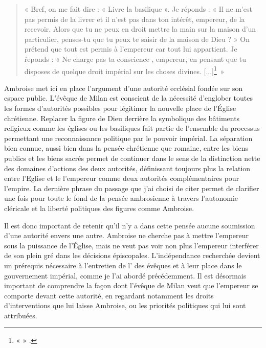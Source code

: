 \bigskip

\begin{quote}
    « Bref, on me fait dire : « Livre la basilique ». Je réponds : « Il ne m’est pas permis de la livrer et il n’est pas dans ton intérêt, empereur, de la recevoir. Alors que tu ne peux en droit mettre la main sur la maison d’un particulier, penses-tu que tu peux te saisir de la maison de Dieu ? » On prétend que tout est permis à l’empereur car tout lui appartient. Je ŕeponds : « Ne charge pas ta conscience , empereur, en pensant que tu disposes de quelque droit impérial sur les choses divines. [...]\footnote{«  » \cite[,19]{ambroise_lettres}.}~»
\end{quote}

\bigskip

Ambroise met ici en place l’argument d’une autorité ecclésial fondée sur son espace public. L’évêque de Milan est conscient de la nécessité d’englober toutes les formes d’autorités possibles pour légitimer la nouvelle place de l’Église chrétienne. Replacer la figure de Dieu derrière la symbolique des bâtiments religieux comme les églises ou les basiliques fait partie de l’ensemble du processus permettant une reconnaissance politique par le pouvoir impérial. La séparation bien connue, aussi bien dans la pensée chrétienne que romaine, entre les biens publics et les biens sacrés permet de continuer dans le sens de la distinction nette des domaines d’actions des deux autorités, définissant toujours plus la relation entre l’Eglise et le l’empereur comme deux autorités complémentaires pour l’empire. La dernière phrase du passage que j’ai choisi de citer permet de clarifier une fois pour toute le fond de la pensée ambrosienne à travers l’autonomie cléricale et la liberté politiques des figures comme Ambroise.

\bigskip

Il est donc important de retenir qu’il n’y a dans cette pensée aucune soumission d’une autorité envers une autre. Ambroise ne cherche pas à mettre l’empereur sous la puissance de l'Église, mais ne veut pas voir non plus l’empereur interférer de son plein gré dans les décisions épiscopales. L’indépendance recherchée devient un prérequis nécessaire à l’entretien de l’ des évêques et à leur place dans le gouvernement impérial, comme je l’ai abordé précédemment. Il est désormais important de comprendre la façon dont l’évêque de Milan veut que l’empereur se comporte devant cette autorité, en regardant notamment les droits d’interventions que lui laisse Ambroise, ou les priorités politiques qui lui sont attribuées.

